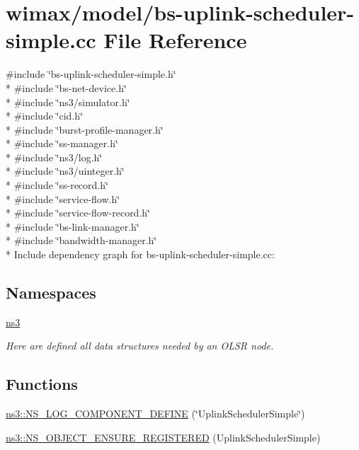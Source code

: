 \hypertarget{bs-uplink-scheduler-simple_8cc}{}\section{wimax/model/bs-\/uplink-\/scheduler-\/simple.cc File Reference}
\label{bs-uplink-scheduler-simple_8cc}
{\ttfamily \#include \char`\"{}bs-\/uplink-\/scheduler-\/simple.\+h\char`\"{}}\\*
{\ttfamily \#include \char`\"{}bs-\/net-\/device.\+h\char`\"{}}\\*
{\ttfamily \#include \char`\"{}ns3/simulator.\+h\char`\"{}}\\*
{\ttfamily \#include \char`\"{}cid.\+h\char`\"{}}\\*
{\ttfamily \#include \char`\"{}burst-\/profile-\/manager.\+h\char`\"{}}\\*
{\ttfamily \#include \char`\"{}ss-\/manager.\+h\char`\"{}}\\*
{\ttfamily \#include \char`\"{}ns3/log.\+h\char`\"{}}\\*
{\ttfamily \#include \char`\"{}ns3/uinteger.\+h\char`\"{}}\\*
{\ttfamily \#include \char`\"{}ss-\/record.\+h\char`\"{}}\\*
{\ttfamily \#include \char`\"{}service-\/flow.\+h\char`\"{}}\\*
{\ttfamily \#include \char`\"{}service-\/flow-\/record.\+h\char`\"{}}\\*
{\ttfamily \#include \char`\"{}bs-\/link-\/manager.\+h\char`\"{}}\\*
{\ttfamily \#include \char`\"{}bandwidth-\/manager.\+h\char`\"{}}\\*
Include dependency graph for bs-\/uplink-\/scheduler-\/simple.cc\+:
\subsection*{Namespaces}
\begin{DoxyCompactItemize}
\item 
 \hyperlink{namespacens3}{ns3}
\begin{DoxyCompactList}\small\item\em Here are defined all data structures needed by an O\+L\+SR node. \end{DoxyCompactList}\end{DoxyCompactItemize}
\subsection*{Functions}
\begin{DoxyCompactItemize}
\item 
\hyperlink{namespacens3_a56dfe2cb965b71a53652b3649aa29aa1}{ns3\+::\+N\+S\+\_\+\+L\+O\+G\+\_\+\+C\+O\+M\+P\+O\+N\+E\+N\+T\+\_\+\+D\+E\+F\+I\+NE} (\char`\"{}Uplink\+Scheduler\+Simple\char`\"{})
\item 
\hyperlink{namespacens3_a378cd8593436b4d0ac6d17130aa3f692}{ns3\+::\+N\+S\+\_\+\+O\+B\+J\+E\+C\+T\+\_\+\+E\+N\+S\+U\+R\+E\+\_\+\+R\+E\+G\+I\+S\+T\+E\+R\+ED} (Uplink\+Scheduler\+Simple)
\end{DoxyCompactItemize}
